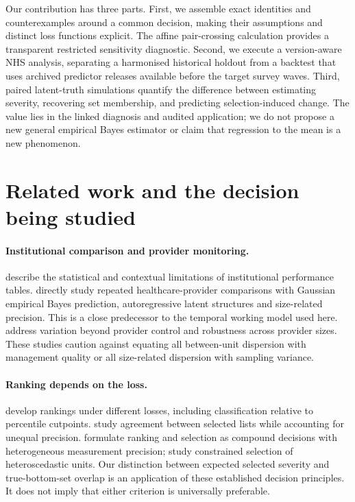 \documentclass[11pt,letterpaper]{article}
\begin{document}
Our contribution has three parts. First, we assemble exact identities and counterexamples around a common decision, making their assumptions and distinct loss functions explicit. The affine pair-crossing calculation provides a transparent restricted sensitivity diagnostic. Second, we execute a version-aware NHS analysis, separating a harmonised historical holdout from a backtest that uses archived predictor releases available before the target survey waves. Third, paired latent-truth simulations quantify the difference between estimating severity, recovering set membership, and predicting selection-induced change. The value lies in the linked diagnosis and audited application; we do not propose a new general empirical Bayes estimator or claim that regression to the mean is a new phenomenon.

\section{Related work and the decision being studied}
\paragraph{Institutional comparison and provider monitoring.}
\citet{goldstein1996league} describe the statistical and contextual limitations of institutional performance tables. \citet{houwelingen2020monitoring} directly study repeated healthcare-provider comparisons with Gaussian empirical Bayes prediction, autoregressive latent structures and size-related precision. This is a close predecessor to the temporal working model used here. \citet{xia2022profiling} address variation beyond provider control and robustness across provider sizes. These studies caution against equating all between-unit dispersion with management quality or all size-related dispersion with sampling variance.

\paragraph{Ranking depends on the loss.}
\citet{lin2006ranking} develop rankings under different losses, including classification relative to percentile cutpoints. \citet{henderson2016cut} study agreement between selected lists while accounting for unequal precision. \citet{gu2023invidious} formulate ranking and selection as compound decisions with heterogeneous measurement precision; \citet{gang2026ranking} study constrained selection of heteroscedastic units. Our distinction between expected selected severity and true-bottom-set overlap is an application of these established decision principles. It does not imply that either criterion is universally preferable.
\end{document}

